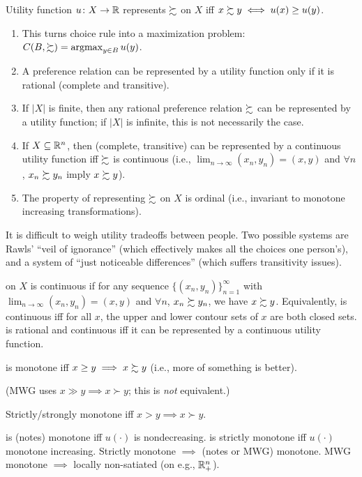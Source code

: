 \documentclass[8pt,letterpaper, landscape]{extarticle} %
\begin{document}
\begin{multicols}{3}
\begin{description}
 Utility function $ u \colon X \rightarrow \mathbb{R} $ represents $ \succsim $ on $ X $ iff $ x \succsim y \iff u(x) \geq u(y) $.
\begin{enumerate}
\item This turns choice rule into a maximization problem: $ C(B, \succsim) = \operatorname*{argmax}_{y \in B} u(y)  $.
\item A preference relation can be represented by a utility function only if it is rational (complete and transitive).
\item If $ |X| $ is finite, then any rational preference relation $ \succsim $ can be represented by a utility function; if $ |X| $ is infinite, this is not necessarily the case.
\item If $ X \subseteq \mathbb{R}^n $, then \pref{} (complete, transitive) can be represented by a continuous utility function iff $ \succsim $ is continuous (i.e., $ \lim_{n\rightarrow \infty} (x_n, y_n) = (x,y) $ and $ \forall n $, $ x_n \succsim y_n $ imply $ x \succsim y $).
\item The property of representing $ \succsim $ on $ X $ is ordinal (i.e., invariant to monotone increasing transformations).
\end{enumerate}

 It is difficult to weigh utility tradeoffs between people. Two possible systems are Rawls' ``veil of ignorance'' (which effectively makes all the choices one person's), and a system of ``just noticeable differences'' (which suffers transitivity issues).

 \pref{} on $ X $ is continuous if for any sequence $ \{ (x_n, y_n) \}_{n=1}^{\infty} $ with $ \lim_{n\rightarrow \infty} (x_n, y_n) = (x,y) $ and $ \forall n $, $ x_n \succsim y_n $, we have $ x \succsim y $. Equivalently, \pref{} is continuous iff for all $ x $, the upper and lower contour sets of $ x $ are both closed sets. \pref{} is rational and continuous iff it can be represented by a continuous utility function.

 \pref{} is monotone iff $ x \geq y \implies x \succsim y $ (i.e., more of something is better).

(MWG uses $ x \gg y \implies x \succ y $; this is \textit{not} equivalent.)

Strictly/strongly monotone iff $ x > y \implies x \succ y $.

\pref{} is (notes) monotone iff $ u (\cdot) $ is nondecreasing. \pref{} is strictly monotone iff $ u (\cdot) $ monotone increasing. Strictly monotone $ \implies $ (notes or MWG) monotone. MWG monotone $ \implies $ locally non-satiated (on e.g., $\mathbb{R}^n_+$).


\end{description}
\end{multicols}
\end{document}
